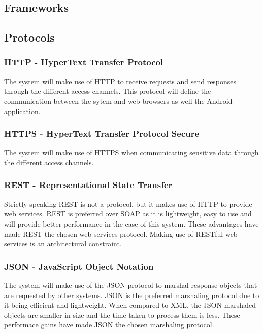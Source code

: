 \subsection{Frameworks}
\subsection{Protocols}

\subsubsection{HTTP - HyperText Transfer Protocol}

The system will make use of HTTP to receive requests and send responses through the different access channels. This protocol will define the communication 
between the sytem and web browsers as well the Android application.

\subsubsection{HTTPS - HyperText Transfer Protocol Secure}

The system will make use of HTTPS when communicating sensitive data through the different access channels.

\subsubsection{REST - Representational State Transfer}

Strictly speaking REST is not a protocol, but it makes use of HTTP to provide web services. REST is preferred over SOAP as it is lightweight, easy to use and will provide
better performance in the case of this system. These advantages have made REST the chosen web services protocol. Making use of RESTful web services is an architectural constraint.

\subsubsection{JSON - JavaScript Object Notation}

The system will make use of the JSON protocol to marshal response objects that are requested by other systems. JSON is the preferred
marshaling protocol due to it being efficient and lightweight. When compared to XML, the JSON marshaled objects are smaller in size
and the time taken to process them is less. These performace gains have made JSON the chosen marshaling protocol.

